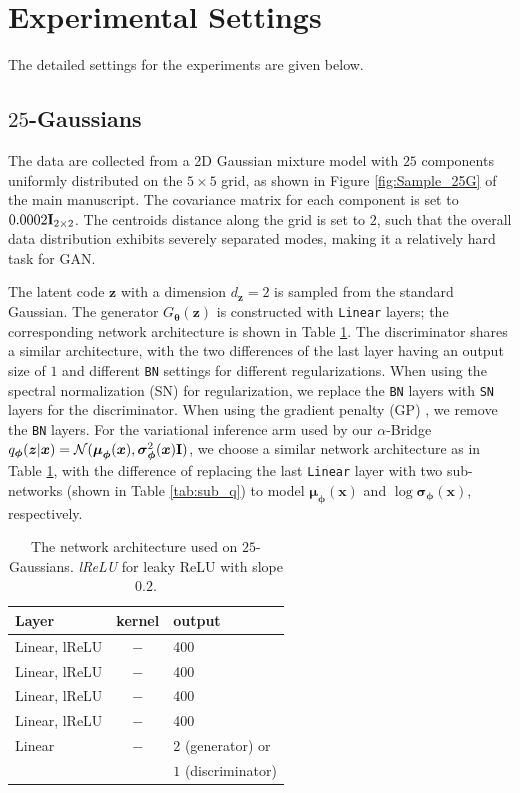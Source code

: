 \documentclass[letterpaper]{article} %
\newcommand{\Nc}[0]{\ensuremath{\mathcal{N}} }
\newcommand{\Imat}[0]{\ensuremath{{\bf I}} }
\newcommand{\xv}[0]{\ensuremath{\boldsymbol{x}} }
\newcommand{\zv}[0]{\ensuremath{\boldsymbol{z}} }
\newcommand{\thetav}[0]{\ensuremath{\boldsymbol{\theta}} }
\newcommand{\muv}[0]{\ensuremath{\boldsymbol{\mu}} }
\newcommand{\sigmav}[0]{\ensuremath{\boldsymbol{\sigma}} }
\newcommand{\phiv}[0]{\ensuremath{\boldsymbol{\phi}} }
\begin{document}
\section{Experimental Settings}
\label{sec:app_exp}


The detailed settings for the experiments are given below.


\subsection{$25$-Gaussians}\label{sec:app_exp_25Gaussian}


The data are collected from a 2D Gaussian mixture model with $25$ components uniformly distributed on the $5 \times 5$ grid, as shown in Figure \ref{fig:Sample_25G} of the main manuscript.
The covariance matrix for each component is set to $0.0002\Imat_{2\times2}$. 
The centroids distance along the grid is set to $2$, such that the overall data distribution exhibits severely separated modes, making it a relatively hard task for GAN. 


The latent code $\zv$ with a dimension $d_{\zv}=2$ is sampled from the standard Gaussian. 
The generator $G_{\thetav}(\zv)$ is constructed with {\tt Linear} layers; the corresponding network architecture is shown in Table \ref{tab:network_25G}. 
The discriminator shares a similar architecture, with the two differences of the last layer having an output size of $1$ and different {\tt BN} settings for different regularizations.
When using the spectral normalization (SN) \cite{miyato2018spectral} for regularization, we replace the {\tt BN} layers with {\tt SN} layers for the discriminator.
When using the gradient penalty (GP) \cite{mescheder2018training}, we remove the {\tt BN} layers. 
For the variational inference arm used by our $\alpha$-Bridge $q_{\phiv}(\zv|\xv)=\Nc(\muv_{\phiv}(\xv), \sigmav^2_{\phiv}(\xv)\Imat)$, we choose a similar network architecture as in Table \ref{tab:network_25G}, with the difference of replacing the last {\tt Linear} layer with two sub-networks (shown in Table \ref{tab:sub_q}) to model $\muv_{\phiv}(\xv)$ and $\log\sigmav_{\phiv}(\xv)$, respectively.

\begin{table}[H]
	\centering
	\caption{The network architecture used on $25$-Gaussians. \emph{lReLU} for leaky ReLU with slope $0.2$.
	}\label{tab:network_25G}
	\begin{tabular}{lcl}\hline\hline
		Layer               & kernel      & output        \\ \hline
		Linear, lReLU   & $-$         & 400          \\ \hline
		Linear, lReLU   & $-$         & 400          \\ \hline
		Linear, lReLU   & $-$         & 400          \\ \hline
		Linear, lReLU   & $-$         & 400          \\ \hline
		Linear              & $-$         & $2$ (generator) or          \\ 
		              &        &  $1$ (discriminator)          \\ \hline\hline
	\end{tabular}
\end{table}
\end{document}
